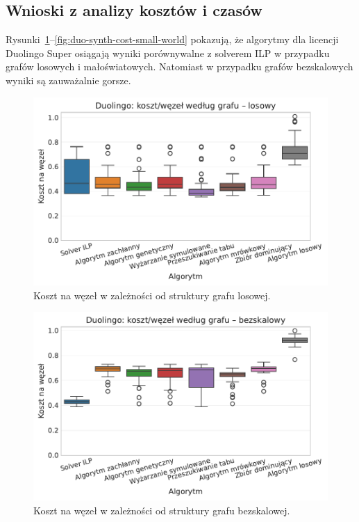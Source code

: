 \subsection{Wnioski z analizy kosztów i czasów}

Rysunki~\ref{fig:duo-synth-cost-random}--\ref{fig:duo-synth-cost-small-world} pokazują, że algorytmy dla licencji Duolingo Super osiągają wyniki porównywalne z solverem ILP w przypadku grafów losowych i małoświatowych. Natomiast w przypadku grafów bezskalowych wyniki są zauważalnie gorsze.


\begin{figure}[H]
  \centering
  \includegraphics[width=0.65\linewidth]{assets/figures/benchmark/synthetic/duolingo_cost_per_node_by_graph_random.pdf}
  \caption{Koszt na węzeł w zależności od struktury grafu losowej.}
  \label{fig:duo-synth-cost-random}
\end{figure}

\begin{figure}[H]
  \centering
  \includegraphics[width=0.65\linewidth]{assets/figures/benchmark/synthetic/duolingo_cost_per_node_by_graph_scale_free.pdf}
  \caption{Koszt na węzeł w zależności od struktury grafu bezskalowej.}
  \label{fig:duo-synth-cost-scale-free}
\end{figure}

